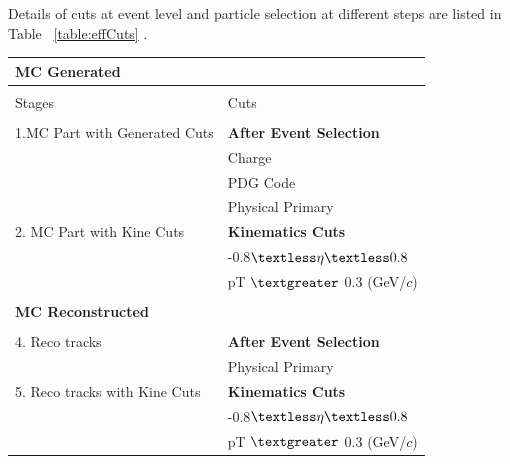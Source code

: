 \newpage
Details of cuts at event level and particle selection at different steps are listed in Table ~\ref{table:effCuts} . \\
\begin{table}[h]
\small
\centering %

\begin{tabular}{  p{5cm} |  p{8.5cm} }
 \\
  \multirow{1}{*}{\large \textbf {MC Generated }} \\
\hline
\\
     Stages         &              Cuts \\
\hline\hline & \\		            	
  1.MC Part with Generated Cuts         &    {\textbf {After Event Selection}}\\
																		   & Charge\\
																		    & PDG Code\\
														  				  & Physical Primary \\

   2. MC Part with Kine Cuts         &              {\textbf {Kinematics Cuts }}\\
															    & -0.8$\textless \eta \textless  0.8$\\
															    & pT $\textgreater$ 0.3 (GeV/$c$)\\

&		\\            	


\multirow{1}{*}{\large \textbf {MC Reconstructed }} & \\
\hline


\hline & \\		            	                        	
4. Reco tracks        &                             {\textbf {After Event Selection}}\\
															   & Physical Primary \\
															
															
5. Reco tracks with Kine Cuts         &               {\textbf  {Kinematics Cuts }}\\
															    & -0.8$\textless \eta \textless  0.8$\\
															    & pT $\textgreater$ 0.3 (GeV/$c$)\\




\end{tabular}
\end{table}
